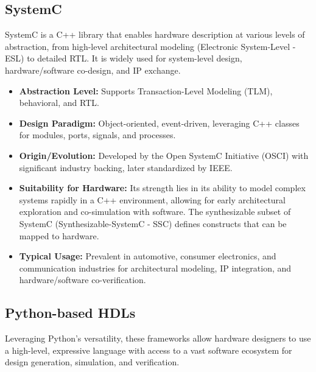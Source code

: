 \documentclass[sigconf, anonymous=false]{acmart} %
\begin{document}
\subsection{SystemC}
SystemC\cite{10246125} is a C++ library that enables hardware description at various levels of abstraction, from high-level architectural modeling (Electronic System-Level - ESL) to detailed RTL. It is widely used for system-level design, hardware/software co-design, and IP exchange.
\begin{itemize}
    \item \textbf{Abstraction Level:} Supports Transaction-Level Modeling (TLM), behavioral, and RTL.
    \item \textbf{Design Paradigm:} Object-oriented, event-driven, leveraging C++ classes for modules, ports, signals, and processes.
    \item \textbf{Origin/Evolution:} Developed by the Open SystemC Initiative (OSCI) with significant industry backing, later standardized by IEEE.
    \item \textbf{Suitability for Hardware:} Its strength lies in its ability to model complex systems rapidly in a C++ environment, allowing for early architectural exploration and co-simulation with software. The synthesizable subset of SystemC (Synthesizable-SystemC - SSC) defines constructs that can be mapped to hardware.
    \item \textbf{Typical Usage:} Prevalent in automotive, consumer electronics, and communication industries for architectural modeling, IP integration, and hardware/software co-verification.
\end{itemize}

\subsection{Python-based HDLs}
Leveraging Python's versatility, these frameworks allow hardware designers to use a high-level, expressive language with access to a vast software ecosystem for design generation, simulation, and verification.
\end{document}
